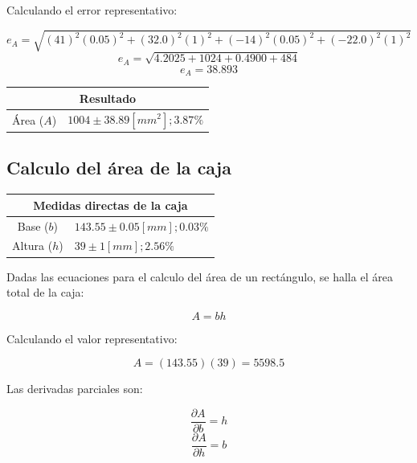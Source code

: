\documentclass[letter,11pt]{article}
\begin{document}
Calculando el error representativo:

\begin{equation*}
    e_A = \sqrt{
        \left(41\right)^2(0.05)^2+
        \left(32.0\right)^2(1)^2+
        \left(-14\right)^2(0.05)^2+
        \left(-22.0\right)^2(1)^2
    }
\end{equation*}
\begin{equation*}
    e_A = \sqrt{4.2025+1024+0.4900+484}
\end{equation*}
\begin{equation*}
    e_A = 38.893
\end{equation*}

\begin{center}
\begin{tabular}{|c|>{\centering}m{5.0cm}<{\centering}|}
\hline
\multicolumn{2}{|c|}{\textbf{Resultado}}
\tabularnewline \hline
Área ($A$) & $1004\pm38.89 [mm^2]; 3.87\%$ \tabularnewline \hline
\end{tabular}
\end{center}

\subsection{Calculo del área de la caja}
\vspace*{0.25cm}
\begin{center}
\begin{tabular}{|c|>{\centering}m{5.0cm}<{\centering}|}
\hline
\multicolumn{2}{|c|}{\textbf{Medidas directas de la caja}}
\tabularnewline \hline
  Base ($b$) & $143.55 \pm 0.05 [mm]; 0.03\%$ \tabularnewline \hline
Altura ($h$) & $ 39    \pm 1    [mm]; 2.56\%$ \tabularnewline \hline
\end{tabular}
\end{center}

Dadas las ecuaciones para el calculo del área de un rectángulo, se halla el
área total de la caja:

\begin{equation}
    A = b h
\tag{rectangulo}
\end{equation}

Calculando el valor representativo:

\begin{equation*}
    A = (143.55)(39) = 5598.5
\end{equation*}

Las derivadas parciales son:

\begin{equation}
    \frac{\partial{A}}{\partial{b}} = h
\end{equation}
\begin{equation}
    \frac{\partial{A}}{\partial{h}} = b
\end{equation}
\end{document}
